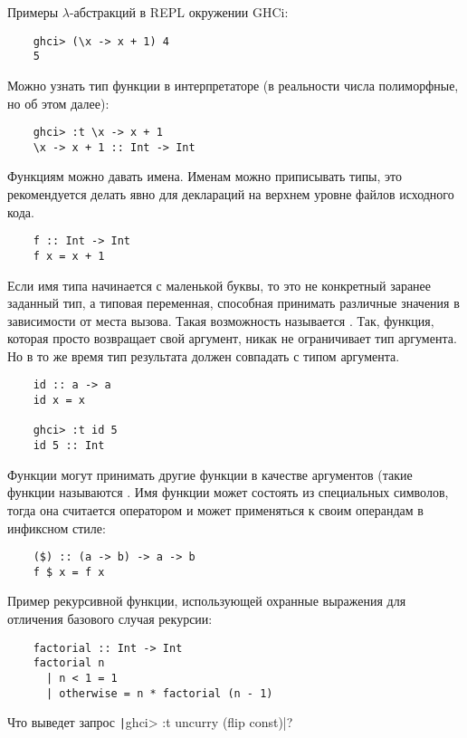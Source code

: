 Примеры $\lambda$-абстракций в REPL окружении GHCi:

\begin{verbatim}
    ghci> (\x -> x + 1) 4
    5
\end{verbatim}

Можно узнать тип функции в интерпретаторе (в реальности числа полиморфные, но об этом далее):
\begin{verbatim}
    ghci> :t \x -> x + 1
    \x -> x + 1 :: Int -> Int
\end{verbatim}

Функциям можно давать имена.
Именам можно приписывать типы, это рекомендуется делать явно для деклараций на верхнем уровне файлов исходного кода.
\begin{verbatim}
    f :: Int -> Int
    f x = x + 1
\end{verbatim}

Если имя типа начинается с маленькой буквы, то это не конкретный заранее заданный тип, а типовая переменная, способная принимать различные значения в зависимости от места вызова.
Такая возможность называется .
Так, функция, которая просто возвращает свой аргумент, никак не ограничивает тип аргумента.
Но в то же время тип результата должен совпадать с типом аргумента.
\begin{verbatim}
    id :: a -> a
    id x = x

    ghci> :t id 5
    id 5 :: Int
\end{verbatim}

Функции могут принимать другие функции в качестве аргументов (такие функции называются .
Имя функции может состоять из специальных символов, тогда она считается оператором и может применяться к своим операндам в инфиксном стиле:
\begin{verbatim}
    ($) :: (a -> b) -> a -> b
    f $ x = f x
\end{verbatim}

Пример рекурсивной функции, использующей охранные выражения для отличения базового случая рекурсии:
\begin{verbatim}
    factorial :: Int -> Int
    factorial n
      | n < 1 = 1
      | otherwise = n * factorial (n - 1)
\end{verbatim}

\begin{task}
    Что выведет запрос \texttt|ghci> :t uncurry (flip const)|?
\end{task}

